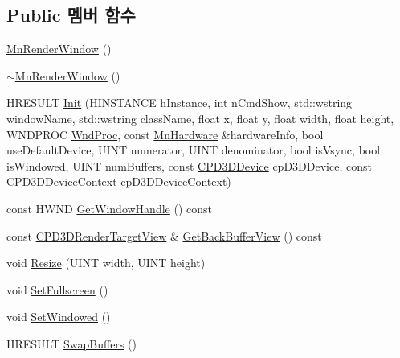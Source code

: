 \subsection*{Public 멤버 함수}
\begin{DoxyCompactItemize}
\item 
\hyperlink{class_m_n_l_1_1_mn_render_window_a5b222688f3b92b62e4fabe88a26c97e8}{Mn\+Render\+Window} ()
\item 
\hyperlink{class_m_n_l_1_1_mn_render_window_aaba5f879d167535f6f6d3ff5d2260beb}{$\sim$\+Mn\+Render\+Window} ()
\item 
H\+R\+E\+S\+U\+LT \hyperlink{class_m_n_l_1_1_mn_render_window_a91ef2588fcdcaf3619206a4ca766cef9}{Init} (H\+I\+N\+S\+T\+A\+N\+CE h\+Instance, int n\+Cmd\+Show, std\+::wstring window\+Name, std\+::wstring class\+Name, float x, float y, float width, float height, W\+N\+D\+P\+R\+OC \hyperlink{main_8cpp_ac996a0edf7f6d6736f7f2920665a453d}{Wnd\+Proc}, const \hyperlink{class_m_n_l_1_1_mn_hardware}{Mn\+Hardware} \&hardware\+Info, bool use\+Default\+Device, U\+I\+NT numerator, U\+I\+NT denominator, bool is\+Vsync, bool is\+Windowed, U\+I\+NT num\+Buffers, const \hyperlink{namespace_m_n_l_a1eec210db8f309a4a9ac0d9658784c31}{C\+P\+D3\+D\+Device} cp\+D3\+D\+Device, const \hyperlink{namespace_m_n_l_aab3aabb6c9360e44ddc8b0bb563c2107}{C\+P\+D3\+D\+Device\+Context} cp\+D3\+D\+Device\+Context)
\item 
const H\+W\+ND \hyperlink{class_m_n_l_1_1_mn_render_window_a07cfd8b1e6bce5dca9ce08622e8f12b4}{Get\+Window\+Handle} () const
\item 
const \hyperlink{namespace_m_n_l_aa08a7c0b5ac9d877dacb57b9306b7b8c}{C\+P\+D3\+D\+Render\+Target\+View} \& \hyperlink{class_m_n_l_1_1_mn_render_window_a19d44672e636e718eaa8a801a2dfacbf}{Get\+Back\+Buffer\+View} () const
\item 
void \hyperlink{class_m_n_l_1_1_mn_render_window_a795840e10508a5c98aff467314cac40f}{Resize} (U\+I\+NT width, U\+I\+NT height)
\item 
void \hyperlink{class_m_n_l_1_1_mn_render_window_a432b906d6590d0acd0a47941da10c62d}{Set\+Fullscreen} ()
\item 
void \hyperlink{class_m_n_l_1_1_mn_render_window_ab7fc225a7460c3bfbe5dd6cdc837e7c8}{Set\+Windowed} ()
\item 
H\+R\+E\+S\+U\+LT \hyperlink{class_m_n_l_1_1_mn_render_window_a7fee685ae92188dee4a23f56a9df1092}{Swap\+Buffers} ()
\end{DoxyCompactItemize}
